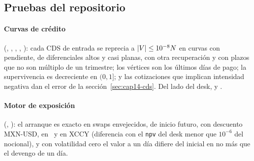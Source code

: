 \begin{raggedright}
\subsection{Pruebas del repositorio}\label{sec:cap14-pruebas}

\paragraph{Curvas de crédito}
(,
,
,
,
): cada CDS de entrada se
reprecia a $|V|\le10^{-8}N$ en curvas con pendiente, de diferenciales altos y casi planas, con otra recuperación y con plazos
que no son múltiplo de un trimestre; los vértices son los últimos días de pago; la supervivencia es decreciente en
$(0,1]$; y las cotizaciones que implican intensidad negativa dan el error de la sección~\ref{sec:cap14-cds}.
Del lado del desk, 
y .

\paragraph{Motor de exposición}
(,
): el arranque es exacto en swaps envejecidos,
de inicio futuro, con descuento MXN-USD, en \USD\ y en XCCY (diferencia con el \texttt{npv} del desk menor que
$10^{-6}$ del nocional), y con volatilidad cero el valor a un día difiere del inicial en no más que el devengo de un día.


\end{raggedright}
